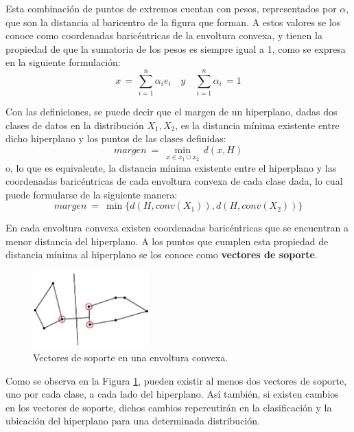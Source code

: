 {Esta combinaci\'on de puntos de extremos cuentan con pesos, representados por $\alpha$, que son la distancia al baricentro de la figura que forman. A estos valores se los conoce como coordenadas baric\'entricas de la envoltura convexa, y tienen la propiedad de que la sumatoria de los pesos es siempre igual a 1, como se expresa en la siguiente formulaci\'on:
$$
x \, = \, \sum_{i=1}^n \alpha_{i}e_{i}	\quad	y	\quad
\sum_{i=1}^n \alpha_{i} \, = 1
$$

Con las definiciones, se puede decir que el margen de un hiperplano, dadas dos clases de datos en la distribuci\'on ${X_{1},X_{2}}$, es la distancia m\'inima existente entre dicho hiperplano y los puntos de las clases definidas:
$$
margen \ = \ \min_{x \in x_{1} \cup x_{2}} \, d(x,H)
$$
o, lo que es equivalente, la distancia m\'inima existente entre el hiperplano y las coordenadas baric\'entricas de cada envoltura convexa de cada clase dada, lo cual puede formularse de la siguiente manera:
$$
margen \ = \ \min \lbrace d(H,conv(X_{1})),d(H,conv(X_{2})) \rbrace
$$

En cada envoltura convexa existen coordenadas baric\'entricas que se encuentran a menor distancia del hiperplano. A los puntos que cumplen esta propiedad de distancia m\'inima al hiperplano se los conoce como \textbf{vectores de soporte}.

\begin{figure}[h]
\centering
\includegraphics[width=0.4\textwidth]{coordenadas_bari.png}
\caption{Vectores de soporte en una envoltura convexa.}
\label{svm:coordenadas_bari}
\end{figure}

Como se observa en la Figura \ref{svm:coordenadas_bari}, pueden existir al menos dos vectores de soporte, uno por cada clase, a cada lado del hiperplano. As\'i tambi\'en, si existen cambios en los vectores de soporte, dichos cambios repercutir\'an en la clasificaci\'on y la ubicaci\'on del hiperplano para una determinada distribuci\'on.
\newline

}
